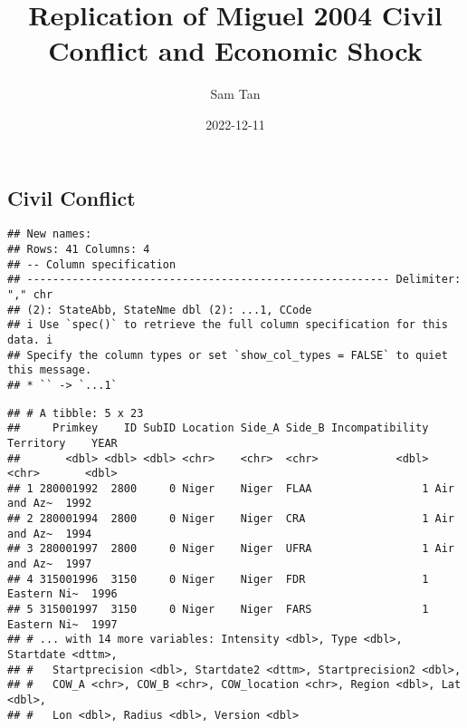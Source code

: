 \documentclass[
]{article}
\title{Replication of Miguel 2004 Civil Conflict and Economic Shock}
\author{Sam Tan}
\date{2022-12-11}
\begin{document}
\maketitle

\hypertarget{civil-conflict}{%
\subsection{Civil Conflict}\label{civil-conflict}}

\begin{verbatim}
## New names:
## Rows: 41 Columns: 4
## -- Column specification
## -------------------------------------------------------- Delimiter: "," chr
## (2): StateAbb, StateNme dbl (2): ...1, CCode
## i Use `spec()` to retrieve the full column specification for this data. i
## Specify the column types or set `show_col_types = FALSE` to quiet this message.
## * `` -> `...1`
\end{verbatim}

\begin{verbatim}
## # A tibble: 5 x 23
##     Primkey    ID SubID Location Side_A Side_B Incompatibility Territory    YEAR
##       <dbl> <dbl> <dbl> <chr>    <chr>  <chr>            <dbl> <chr>       <dbl>
## 1 280001992  2800     0 Niger    Niger  FLAA                 1 Air and Az~  1992
## 2 280001994  2800     0 Niger    Niger  CRA                  1 Air and Az~  1994
## 3 280001997  2800     0 Niger    Niger  UFRA                 1 Air and Az~  1997
## 4 315001996  3150     0 Niger    Niger  FDR                  1 Eastern Ni~  1996
## 5 315001997  3150     0 Niger    Niger  FARS                 1 Eastern Ni~  1997
## # ... with 14 more variables: Intensity <dbl>, Type <dbl>, Startdate <dttm>,
## #   Startprecision <dbl>, Startdate2 <dttm>, Startprecision2 <dbl>,
## #   COW_A <chr>, COW_B <chr>, COW_location <chr>, Region <dbl>, Lat <dbl>,
## #   Lon <dbl>, Radius <dbl>, Version <dbl>
\end{verbatim}
\end{document}
